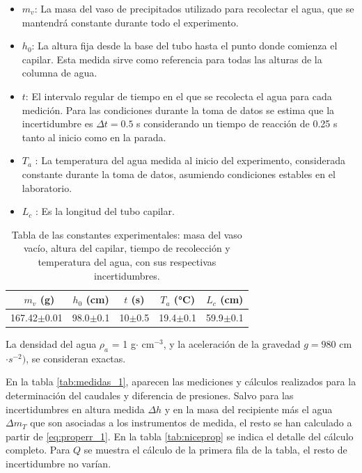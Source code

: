	\begin{itemize}
		\item $m_v$: La masa del vaso de precipitados utilizado para recolectar el agua, que se mantendrá constante durante todo el experimento.
		\item $h_0$: La altura fija desde la base del tubo hasta el punto donde comienza el capilar. Esta medida sirve como referencia para todas las alturas de la columna de agua.
		\item $t$: El intervalo regular de tiempo en el que se recolecta el agua para cada medición. Para las condiciones durante la toma de datos se estima que la incertidumbre es $\Delta t = 0.5$ s considerando  un tiempo de reacción de 0.25 s tanto al inicio como en la parada.
		\item  $T_a$ : La temperatura del agua medida al inicio del experimento, considerada constante durante la toma de datos, asumiendo condiciones estables en el laboratorio.
		\item  $L_c$ : Es la longitud del tubo capilar.
	\end{itemize}
	
	
	\begin{table}[H]
		\centering
		\begin{minipage}{0.7\textwidth} 
			\centering
			\begin{tabular}{|c|c|c|c|c|}
				\toprule
				\ $m_v$ (g) & $h_0$ (cm)  & $t$ (s) & $T_a$ (°C) & $L_c$ (cm) \\
				\hline
				167.42$\pm$0.01 & 98.0$\pm$0.1 & 10$\pm$0.5 & 19.4$\pm$0.1 & 59.9$\pm$0.1      \\
				\bottomrule
			\end{tabular}
			\caption{\footnotesize Tabla de las constantes experimentales: masa del vaso vacío, altura del capilar, tiempo de recolección y temperatura del agua, con sus respectivas incertidumbres.}
		\label{tab:constexp}
		\end{minipage}
	\end{table}

	La densidad del agua $\rho_a$ = 1 g$\cdot$ cm$^{-3}$, y la aceleración de la gravedad $g = 980$ cm$\cdot s^{-2})$, se consideran exactas.
	
	\vspace{\baselineskip}
	
	En la tabla \ref{tab:medidas_1}, aparecen las mediciones y cálculos realizados para la determinación del caudales y diferencia de presiones. Salvo para las incertidumbres en altura medida $\Delta h$ y en la masa del recipiente más el agua $\Delta m_T$ que son asociadas a los instrumentos de medida, el resto se han calculado  a partir de  \ref{eq:properr_1}. En la tabla \ref{tab:niceprop} se indica el detalle del cálculo completo. Para $Q$ se muestra el cálculo de la primera fila de la tabla, el resto de incertidumbre no varían.
	

